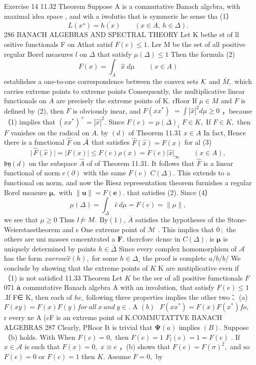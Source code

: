 Exercise 14 11.32 Theorem Suppose A is a commutative Banach algcbra, with maximal idea space , and wih a iwolutio that is symmeric he sense tha (1） $$ L(x^{\star})=\overline{{{h(x)}}}\qquad(x\in A,\,h\in\Delta). $$286 BANACH ALGEBRAS AND SPECTRAL THEORY Let K bethe st of ll ositive functionals F on Athat satisf $F(e)\leq1.$ Ler M be the set of all positive regular Borel measures $\boldsymbol{\mathit{l}}$ on $\Delta$ that satisfy $\mu(\Delta)\leq1$ Then the formula (2) $$ F(x)=\int_{\Lambda}{\hat{x}}\;d\mu\qquad(x\in A) $$ establishes a one-to-one correspondence between the convex sets ${\cal K}$ and $\bar{M},$ which carries extreme points to extreme points Consequently, the multiplicative linear functionals on $\textstyle{A}$ are precisely the extreme points of K. rRoor If $\mu\in M$ and ${\mathbf{}}F$ is defined by (2), then ${\mathbf{}}F$ is obviously inear, and $F(x x^{*})$ $={\int}\left|{\hat{x}}\right|^{2}d\mu\geq0$ ，because（1) implies that $(x x^{*})^{\times}=|\hat{x}|^{2}.$ Since $F(e)=\mu(\Delta)_{i}$ $F\in K,$ If $F\in K,$ then ${\mathbf{}}F$ vanishes on the radical on $A.$ by $(d)$ of Theorem 11.31 $x\in A$ In fact, Hence there is a functional $\hat{F}$ on $\hat{\cal A}$ that satisfies ${\hat{F}}({\hat{x}})=F(x)$ for al (3) $$ \big\vert\,\hat{F}(\hat{x})\big\vert=\big\vert F(x)\big\vert\leq F(e)\rho(x)=F(e)\big\vert\hat{x}\big\vert_{\infty}\qquad(x\in A), $$ ${\mathfrak{b y}}\left(d\right)$ on the subspace $\hat{A}$ of of Theorem 11.31. It follows that $\hat{F}$ is a linear functional of norm $c(\partial)$ with the same $F(e)$ $C(\Delta).$ This extends to a functional on norm, and now the Riesz representation theorem furnishes a regular Borel measure ${\boldsymbol{\mu}},$ with $\|{\boldsymbol{u}}\|=F({\boldsymbol{e}}).$ that satisfies (2). Since (4） $$ \mu(\Delta)=\int_{\Delta}\hat{e}\,d\mu=F(e)=\|\mu\|, $$ we see that $\mu\geq0$ Thus $l\,\rlap{/}{=}\;M.$ $\mathrm{By}\left(1\right),\,{\bar{A}}$ satisfies the hypotheses of the Stone-Weierstasstheorem and s One extreme point of $\mathcal{M}$ . This implics that $0\,;$ the others are uni masses concentrated a ${\boldsymbol{F}}.$ thcrcforc dcnsc in $C(\Delta).$ is $\boldsymbol{\mu}$ is uniquely determined by points $h\in{\bar{\Delta}}$ Since every complex homomorphism of $\textstyle{\mathcal{A}}$ has the form $x arrow\hat{x}(h),$ for some $h\in\Delta_{\circ}$ the proof is completc ${a\!\!\!/}{b\!\!\!/}{b\!\!\!/}$ We conclude by showing that the extreme points of $K$ K are mutiplicative even if （1) is not satisficd 11.33 Theorem Let $\textstyle K$ be the ser of all positive fumctionals ${\mathbf{}}F$ 071 $\bar{\boldsymbol{a}}$ commutative Banach algebra A with an involution, that satisfy $F(e)\leq1$ .If F∈ K, then each of $\scriptstyle h e_{\circ}$ following three properties implies the other two： (a) $F(x y)=F(x)F(y)f o r\ a l l\ x\ a n d\ y\in.$ A $(b)\ \ \ F(x x^{\ast})=F(x)F(x^{\ast})f o,$ r every xe A (cF is an extreme point of K.COMMUTATTVE BANACH ALGEBRAS 287 Clearly, PRoor It is trivial that $\mathbf{\Psi}(a)$ implies $(B).$ Suppose（b) holds. With When $F(c)=0,$ then $F(e)=1$ $F_{l}(e)=1=F(e)$ . If $x\in{\mathcal{A}}$ is such that $F(x)=0,$ $x\equiv e$ ，(b) shows that $F(e)=F(\sigma)^{2},$ and so $F(e)=0$ or $F(c)=1$ then $K.$ Assume $F=0,$ by 